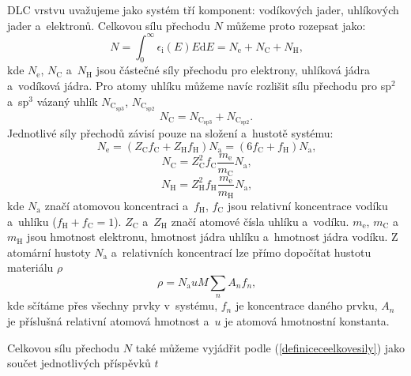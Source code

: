 DLC vrstvu uvažujeme jako systém tří komponent: vodíkových jader, uhlíkových jader a~elektronů. Celkovou sílu přechodu $N$ můžeme proto rozepsat jako:
\begin{equation}
N = \int_0^\infty \epsilon_\mathrm{i}(E) E \mathrm{d}E = N_\mathrm{e} + N_\mathrm{C} + N_\mathrm{H} \text{,}
\end{equation} 
kde $N_\mathrm{e}$, $N_\mathrm{C}$ a~$N_\mathrm{H}$ jsou částečné síly přechodu pro elektrony, uhlíková jádra a~vodíková jádra. Pro atomy uhlíku můžeme navíc rozlišit sílu přechodu pro sp$^2$ a~sp$^3$ vázaný uhlík $N_\mathrm{C_{sp3}}$, $N_\mathrm{C_{sp2}}$
\begin{equation}
N_\mathrm{C} = N_\mathrm{C_{sp3}} + N_\mathrm{C_{sp2}} \text{.}
\end{equation} 
Jednotlivé síly přechodů závisí pouze na složení a~hustotě systému:
\begin{equation}
N_\mathrm{e} = (Z_\mathrm{C}f_\mathrm{C} + Z_\mathrm{H} f_\mathrm{H}) N_\mathrm{a} = (6f_\mathrm{C} + f_\mathrm{H})N_\mathrm{a} \text{,}
\end{equation}
\begin{equation}
N_\mathrm{C} = Z^2_\mathrm{C} f_\mathrm{C} \frac{m_\mathrm{e}}{m_\mathrm{C}} N_\mathrm{a} \text{,}
\end{equation}
\begin{equation}
N_\mathrm{H} = Z^2_\mathrm{H} f_\mathrm{H} \frac{m_\mathrm{e}}{m_\mathrm{H}} N_\mathrm{a} \text{,}
\end{equation}
kde $N_\mathrm{a}$ značí atomovou koncentraci a~$f_\mathrm{H}$, $f_\mathrm{C}$ jsou relativní koncentrace vodíku a~uhlíku ($f_\mathrm{H} + f_\mathrm{C} = 1 $). $Z_\mathrm{C}$ a~$Z_\mathrm{H}$ značí atomové čísla uhlíku a~vodíku. $m_\mathrm{e}$, $m_\mathrm{C}$ a~$m_\mathrm{H}$ jsou hmotnost elektronu, hmotnost jádra uhlíku a~hmotnost jádra vodíku. Z atomární hustoty $N_\mathrm{a}$ a~relativních koncentrací lze přímo dopočítat hustotu materiálu $\rho$
\begin{equation}
\rho = N_\mathrm{a} u M \sum_n A_n f_n \text{,}
\label{mdensity}
\end{equation}
kde sčítáme přes všechny prvky v~systému, $f_n$ je koncentrace daného prvku, $A_n$ je příslušná relativní atomová hmotnost a~$u$ je atomová hmotnostní konstanta.

Celkovou sílu přechodu $N$ také můžeme vyjádřit podle (\ref{definiceceelkovesily}) jako součet jednotlivých příspěvků $t$

